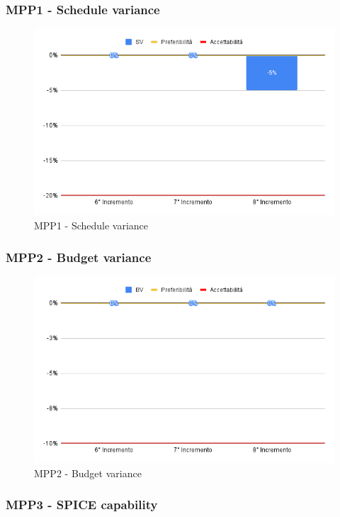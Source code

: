 \subsubsection{MPP1 - Schedule variance}
\begin{figure}[H]
	\centering
	\includegraphics[scale = 0.6]{sezioni/Images/CA/SV.png}
	\caption{MPP1 - Schedule variance}
\end{figure}

\subsubsection{MPP2 - Budget variance}

\begin{figure}[H]
	\centering
	\includegraphics[scale = 0.6]{sezioni/Images/CA/BV.png}
	\caption{MPP2 - Budget variance}
\end{figure}

\subsubsection{MPP3 - SPICE capability}

